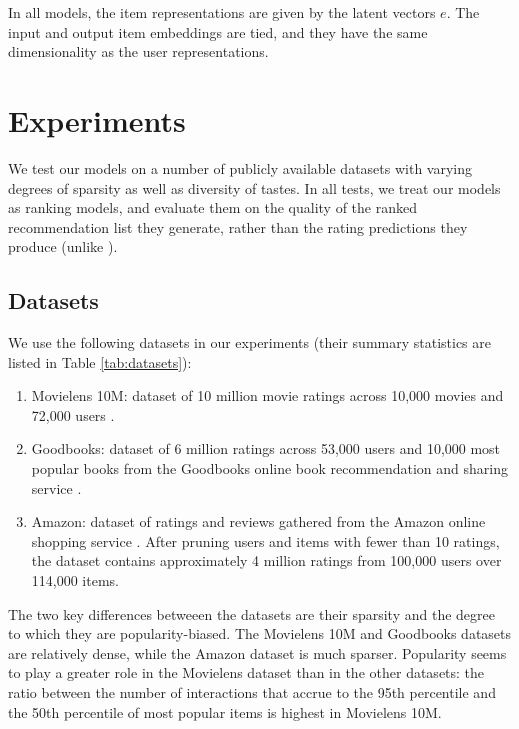 \documentclass[sigconf]{acmart}
\begin{document}
In all models, the item representations are given by the latent vectors $e$. The input and output item embeddings are tied, and they have the same dimensionality as the user representations.

\section{Experiments}
We test our models on a number of publicly available datasets with varying degrees of sparsity as well as diversity of tastes. In all tests, we treat our models as ranking models, and evaluate them on the quality of the ranked recommendation list they generate, rather than the rating predictions they produce (unlike \citep{wu2017recurrent}).


\subsection{Datasets}
We use the following datasets in our experiments (their summary statistics are listed in Table \ref{tab:datasets}):

\begin{enumerate}
\item Movielens 10M: dataset of 10 million movie ratings across 10,000 movies and 72,000 users \citep{harper2016movielens}.
\item Goodbooks: dataset of 6 million ratings across 53,000 users and 10,000 most popular books from the Goodbooks online book recommendation and sharing service \citep{goodbooks2017}.
\item Amazon: dataset of ratings and reviews gathered from the Amazon online shopping service \citep{leskovec2007dynamics}. After pruning users and items with fewer than 10 ratings, the dataset contains approximately 4 million ratings from 100,000 users over 114,000 items.
\end{enumerate}
The two key differences betweeen the datasets are their sparsity and the degree to which they are popularity-biased. The Movielens 10M and Goodbooks datasets are relatively dense, while the Amazon dataset is much sparser. Popularity seems to play a greater role in the Movielens dataset than in the other datasets: the ratio between the number of interactions that accrue to the 95th percentile and the 50th percentile of most popular items is highest in Movielens 10M.
\end{document}

